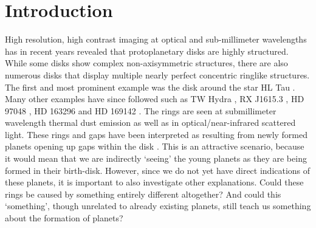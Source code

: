 \documentclass{aa}
\begin{document}
\section{Introduction}
High resolution, high contrast imaging at optical and sub-millimeter wavelengths
has in recent years revealed that protoplanetary disks are highly structured.
While some disks show complex non-axisymmetric structures, there are also
numerous disks that display multiple nearly perfect concentric ringlike
structures. The first and most prominent example was the disk around the star HL
Tau \citep{2015ApJ...808L...3A}. Many other examples have since followed such as
TW Hydra \citep{2016ApJ...820L..40A,2017ApJ...837..132V}, RX J1615.3
\citep{2016A&A...595A.114D}, HD 97048 \citep{2016A&A...595A.112G}, HD 163296
\citep{2016PhRvL.117y1101I} and HD 169142 \citep{2015PASJ...67...83M,
  2017A&A...600A..72F}. The rings are seen at submillimeter wavelength thermal
dust emission as well as in optical/near-infrared scattered light. These rings
and gaps have been interpreted as resulting from newly formed planets opening up
gaps within the disk \citep[e.g.][]{2015MNRAS.454L..36G, 2015ApJ...806L..15K,
  2015A&A...584A.110P}. This is an attractive scenario, because it would mean
that we are indirectly `seeing' the young planets as they are being formed in
their birth-disk. However, since we do not yet have direct indications of these
planets, it is important to also investigate other explanations. Could these
rings be caused by something entirely different altogether? And could this
`something', though unrelated to already existing planets, still teach us
something about the formation of planets?
\end{document}
